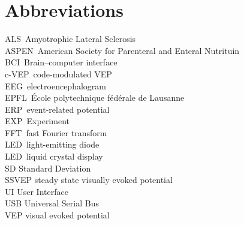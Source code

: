 \chapter{Abbreviations}
ALS\	Amyotrophic Lateral Sclerosis\\
ASPEN\	American Society for Parenteral and Enteral Nutrituin\\
BCI\	Brain–computer interface\\
c-VEP\	code-modulated VEP\\
EEG\	electroencephalogram\\
EPFL\	École polytechnique fédérale de Lausanne\\
ERP\	event-related potential\\
EXP\	Experiment\\
FFT\	fast Fourier transform\\
LED\	light-emitting diode\\
LED\	liquid crystal display\\
SD		Standard Deviation\\
SSVEP	steady state visually evoked potential\\
UI		User Interface\\
USB		Universal Serial Bus\\
VEP		visual evoked potential\\
